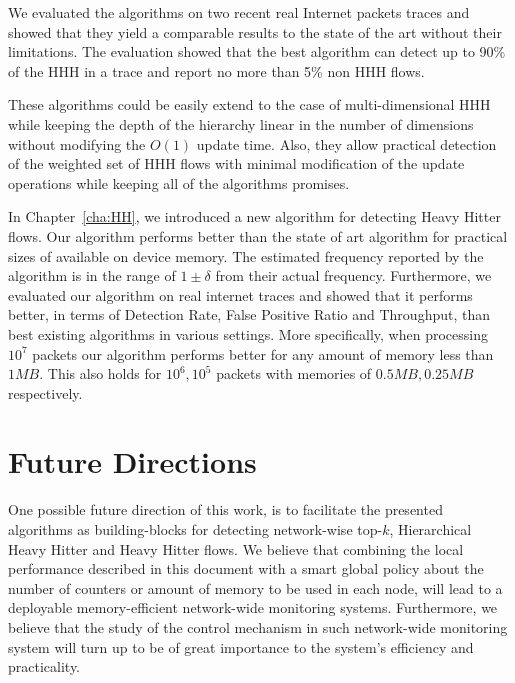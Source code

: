 We evaluated the algorithms on two recent real Internet packets traces and showed that they yield a comparable results to the state of the art without their limitations. The evaluation showed that the best algorithm can detect up to 90\% of the HHH in a trace and report no more than 5\% non HHH flows.

These algorithms could be easily extend to the case of multi-dimensional HHH while keeping the depth of the hierarchy linear in the number of dimensions without modifying the $O(1)$ update time. Also, they allow practical detection of the weighted set of HHH flows with minimal modification of the update operations while keeping all of the algorithms promises.

In Chapter~\ref{cha:HH}, we introduced a new algorithm for detecting Heavy Hitter flows. Our algorithm performs better than the state of art algorithm for practical sizes of available on device memory. The estimated frequency reported by the algorithm is in the range of $1\pm \delta$ from their actual frequency. Furthermore, we evaluated our algorithm on real internet traces and showed that it performs better, in terms of Detection Rate, False Positive Ratio and Throughput, than best existing algorithms in various settings. More specifically, when processing $10^7$ packets our algorithm performs better for any amount of memory less than $1MB$. This also holds for $10^6, 10^5$ packets with memories of $0.5MB, 0.25MB$ respectively.

\section*{Future Directions}

One possible future direction of this work, is to facilitate the presented algorithms as building-blocks for detecting network-wise top-$k$, Hierarchical Heavy Hitter and Heavy Hitter flows. We believe that combining the local performance described in this document with a smart global policy about the number of counters or amount of memory to be used in each node, will lead to a deployable memory-efficient network-wide monitoring systems. Furthermore, we believe that the study of the control mechanism in such network-wide monitoring system will turn up to be of great importance to the system's efficiency and practicality.
